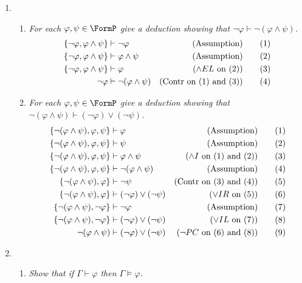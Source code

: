 \documentclass[10pt]{article}
\begin{document}
\begin{enumerate}
\item
\begin{enumerate}
\item \emph{For each $\varphi, \psi \in \FormP$ give a deduction showing that $\neg \varphi \vdash \neg (\varphi \land \psi)$.}
\begin{align*}
\left\{ \neg\varphi, \varphi \land \psi \right\} &\vdash \neg\varphi & (\mbox{Assumption}) \tag{1}\\
\left\{ \neg\varphi, \varphi \land \psi \right\} &\vdash \varphi \land \psi & (\mbox{Assumption}) \tag{2}\\
\left\{ \neg\varphi, \varphi \land \psi \right\} &\vdash \varphi & (\mbox{$\land EL$ on (2)}) \tag{3}\\
\neg \varphi &\vdash \neg(\varphi \land \psi) & (\mbox{Contr on (1) and (3)}) \tag{4}
\end{align*}
\item \emph{For each $\varphi, \psi \in \FormP$ give a deduction showing that $\neg(\varphi \land \psi) \vdash (\neg\varphi) \lor (\neg\psi)$.}
\begin{align*}
\left\{ \neg(\varphi \land \psi), \varphi, \psi \right\} & \vdash \varphi & (\mbox{Assumption}) \tag{1} \\
\left\{ \neg(\varphi \land \psi), \varphi, \psi \right\} & \vdash \psi & (\mbox{Assumption}) \tag{2} \\
\left\{ \neg(\varphi \land \psi), \varphi, \psi \right\} & \vdash \varphi \land \psi & (\mbox{$\land I$ on (1) and (2)}) \tag{3} \\
\left\{ \neg(\varphi \land \psi), \varphi, \psi \right\} & \vdash \neg(\varphi \land \psi) & (\mbox{Assumption}) \tag{4} \\
\left\{ \neg(\varphi \land \psi), \varphi \right\} & \vdash \neg\psi & (\mbox{Contr on (3) and (4)}) \tag{5} \\
\left\{ \neg(\varphi \land \psi), \varphi \right\} & \vdash (\neg\varphi) \lor (\neg\psi) & (\mbox{$\lor IR$ on (5)}) \tag{6} \\
\left\{ \neg(\varphi \land \psi), \neg\varphi \right\} & \vdash \neg\varphi & (\mbox{Assumption}) \tag{7} \\
\left\{ \neg(\varphi \land \psi), \neg\varphi \right\} & \vdash (\neg\varphi) \lor (\neg\psi) & (\mbox{$\lor IL$ on (7)}) \tag{8} \\
\neg(\varphi \land \psi) & \vdash (\neg\varphi) \lor (\neg\psi) & (\mbox{$\neg PC$ on (6) and (8)}) \tag{9}
\end{align*}
\end{enumerate}

\item
\begin{enumerate}
\item \emph{Show that if $\Gamma \vdash \varphi$ then $\Gamma \vDash \varphi$.}


\end{enumerate}
\end{enumerate}
\end{document}
